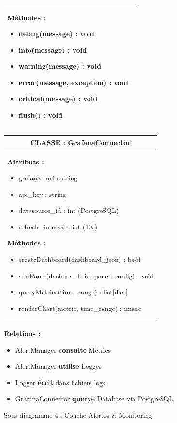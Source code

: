 \begin{figure}[H]
{\begin{minipage}{0.95\textwidth}
\begin{tabular}{|p{2.5cm}|p{7cm}|}
{    \textbf{Méthodes :}
    \begin{itemize}
        \item debug(message) : void
        \item info(message) : void
        \item warning(message) : void
        \item error(message, exception) : void
        \item critical(message) : void
        \item flush() : void
    \end{itemize}
    } \\
    \hline
    \end{tabular}
    
    \vspace{0.5cm}
    
    \begin{tabular}{|p{2.5cm}|p{7cm}|}
    \hline
    \multicolumn{2}{|c|}{\textbf{CLASSE : GrafanaConnector}} \\
    \hline
    \multicolumn{2}{|p{9.5cm}|}{
    \textbf{Attributs :}
    \begin{itemize}
        \item grafana\_url : string
        \item api\_key : string
        \item datasource\_id : int (PostgreSQL)
        \item refresh\_interval : int (10s)
    \end{itemize}
    
    \textbf{Méthodes :}
    \begin{itemize}
        \item createDashboard(dashboard\_json) : bool
        \item addPanel(dashboard\_id, panel\_config) : void
        \item queryMetrics(time\_range) : list[dict]
        \item renderChart(metric, time\_range) : image
    \end{itemize}
    } \\
    \hline
    \end{tabular}
    
    \vspace{0.5cm}
    
    \textbf{Relations :}
    \begin{itemize}
        \item AlertManager \textbf{consulte} Metrics
        \item AlertManager \textbf{utilise} Logger
        \item Logger \textbf{écrit} dans fichiers logs
        \item GrafanaConnector \textbf{querye} Database via PostgreSQL
    \end{itemize}
    
    \end{minipage}}
    \caption{Sous-diagramme 4 : Couche Alertes \& Monitoring}
    \label{fig:class-alerts}
\end{figure}

